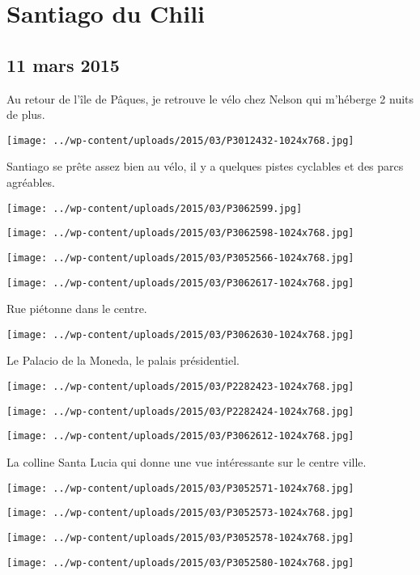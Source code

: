 \chapter{Santiago du Chili}
\section*{11 mars 2015}
Au retour de l'île de Pâques, je retrouve le vélo chez Nelson qui m'héberge 2 nuits de plus. \newline
\centerline{\texttt{[image: ../wp-content/uploads/2015/03/P3012432-1024x768.jpg]} } 
 Santiago se prête assez bien au vélo, il y a quelques pistes cyclables et des parcs agréables. \newline
\centerline{\texttt{[image: ../wp-content/uploads/2015/03/P3062599.jpg]} } 
 \newline
\centerline{\texttt{[image: ../wp-content/uploads/2015/03/P3062598-1024x768.jpg]} } 
\newline
\centerline{\texttt{[image: ../wp-content/uploads/2015/03/P3052566-1024x768.jpg]} } 
\newline
\centerline{\texttt{[image: ../wp-content/uploads/2015/03/P3062617-1024x768.jpg]} } 
 Rue piétonne dans le centre.\newline
\centerline{\texttt{[image: ../wp-content/uploads/2015/03/P3062630-1024x768.jpg]} } 
 Le Palacio de la Moneda, le palais présidentiel. \newline
\centerline{\texttt{[image: ../wp-content/uploads/2015/03/P2282423-1024x768.jpg]} } 
 \newline
\centerline{\texttt{[image: ../wp-content/uploads/2015/03/P2282424-1024x768.jpg]} } 
 \newline
\centerline{\texttt{[image: ../wp-content/uploads/2015/03/P3062612-1024x768.jpg]} } 
La colline Santa Lucia qui donne une vue intéressante sur le centre ville. \newline
\centerline{\texttt{[image: ../wp-content/uploads/2015/03/P3052571-1024x768.jpg]} } 
 \newline
\centerline{\texttt{[image: ../wp-content/uploads/2015/03/P3052573-1024x768.jpg]} } 
 \newline
\centerline{\texttt{[image: ../wp-content/uploads/2015/03/P3052578-1024x768.jpg]} } 
 \newline
\centerline{\texttt{[image: ../wp-content/uploads/2015/03/P3052580-1024x768.jpg]} } 
